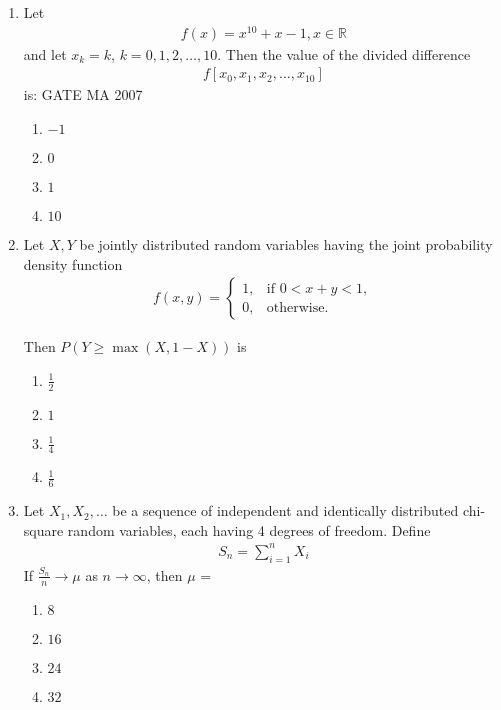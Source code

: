 \documentclass[journal]{IEEEtran}
\numberwithin{equation}{enumi}
\numberwithin{figure}{enumi}
\begin{document}
\begin{enumerate}
\item Let 
\begin{align*}
  f(x) = x^{10} + x - 1, x \in \mathbb{R}  
\end{align*}
and let $x_k = k$, $k=0,1,2,\dots,10$. Then the value of the divided difference
\begin{align*}
f[x_0, x_1, x_2, \dots, x_{10}]
\end{align*}
is:
\hfill{GATE MA 2007}
\begin{multicols}{4}
\begin{enumerate}
    \item $-1$
    \item $0$
    \item $1$
    \item $10$
\end{enumerate}
\end{multicols}
 

\item  Let $X, Y$ be jointly distributed random variables having the joint probability density function
\begin{align*}
f(x,y) = \begin{cases}
1, & \text{if } 0 < x + y < 1, \\
0, & \text{otherwise.}
\end{cases}
\end{align*}

Then $P(Y \ge \max(X, 1 - X))$ is
\hfill{}

\begin{multicols}{4}
\begin{enumerate}
    \item $\tfrac{1}{2}$
    \item $1$
    \item $\tfrac{1}{4}$
    \item $\tfrac{1}{6}$
\end{enumerate}
\end{multicols}


\item Let $X_1, X_2, \dots$ be a sequence of independent and identically distributed chi-square random variables, each having 4 degrees of freedom. Define
\begin{align*}
S_n = \sum_{i=1}^n X_i
\end{align*}
If $\frac{S_n}{n} \to \mu$ as $n \to \infty$, then $\mu$ =
\hfill{}
\begin{multicols}{4}
\begin{enumerate}
    \item $8$
    \item $16$
    \item $24$
    \item $32$
\end{enumerate}
\end{multicols}
 



\end{enumerate}
\end{document}
